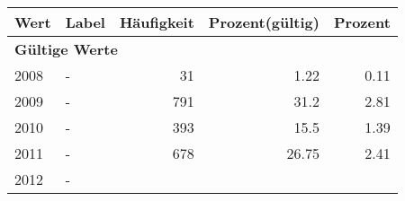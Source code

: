      \begin{longtable}{lXrrr}
     \toprule
     \textbf{Wert} & \textbf{Label} & \textbf{Häufigkeit} & \textbf{Prozent(gültig)} & \textbf{Prozent} \\
     \endhead
     \midrule
     \multicolumn{5}{l}{\textbf{Gültige Werte}}\\

     2008 &
     \multicolumn{1}{X}{ -  } &


       \num{31} &
       \num[round-mode=places,round-precision=2]{1,22} &
         \num[round-mode=places,round-precision=2]{0,11} \\

     2009 &
     \multicolumn{1}{X}{ -  } &


       \num{791} &
       \num[round-mode=places,round-precision=2]{31,2} &
         \num[round-mode=places,round-precision=2]{2,81} \\

     2010 &
     \multicolumn{1}{X}{ -  } &


       \num{393} &
       \num[round-mode=places,round-precision=2]{15,5} &
         \num[round-mode=places,round-precision=2]{1,39} \\

     2011 &
     \multicolumn{1}{X}{ -  } &


       \num{678} &
       \num[round-mode=places,round-precision=2]{26,75} &
         \num[round-mode=places,round-precision=2]{2,41} \\

     2012 &
     \multicolumn{1}{X}{ -  } &



\end{longtable}
